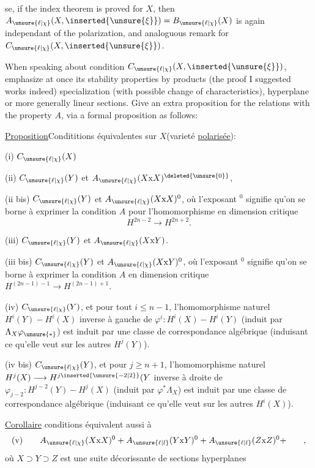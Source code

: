 se, if the index theorem is proved for $X$, then $A_{\unsure{\ell|\chi}}(X,\inserted{\unsure{\xi}})=B_{\unsure{\ell|\chi}}(X)$ is again independant of the polarization, and analoguous remark for $C_{\unsure{\ell|\chi}}(X,\inserted{\unsure{\xi}})$.

When speaking about condition $C_{\unsure{\ell|\chi}}(X,\inserted{\unsure{\xi}})$, emphasize at once its stability properties by products (the proof I suggested works indeed) specialization (with possible change of characteristics), hyperplane or more generally linear sections. Give an extra proposition for the relations with the property $A$, via a formal proposition as follows:

\uline{Proposition}\quad Condititions équivalentes sur $X$(varieté \uline{polarisée}):

(i) $C_{\unsure{\ell|\chi}}(X)$

(ii) $C_{\unsure{\ell|\chi}}(Y)$ et $A_{\unsure{\ell|\chi}}(X\mathrm{x}X)^{\deleted{\unsure{0}}}$, 

(ii bis) $C_{\unsure{\ell|\chi}}(Y)$ et $A_{\unsure{\ell|\chi}}(X\mathrm{x}X)^0$, où l'exposant $^0$ signifie qu'on se borne à exprimer la condition $A$ pour l'homomorphisme en dimension critique
\[
H^{2n-2}\longrightarrow H^{2n+2}.
\]

(iii) $C_{\unsure{\ell|\chi}}(Y)$ et $A_{\unsure{\ell|\chi}}(X\mathrm{x}Y)$.

(iii bis) $C_{\unsure{\ell|\chi}}(Y)$ et $A_{\unsure{\ell|\chi}}(X\mathrm{x}Y)^0$, où l'exposant $^0$ signifie qu'on se borne à exprimer la condition $A$ en dimension critique $H^{(2n-1)-1}\longrightarrow H^{(2n-1)+1}$.

(iv)  $C_{\unsure{\ell|\chi}}(Y)$, et pour tout $i\leq n-1$, l'homomorphisme naturel $H^i(Y)\mathbin{-}H^i(X)$ inverse à gauche de $\varphi^i:H^i(X)\mathbin{-}H^i(Y)$ (induit par $\Lambda_X\varphi_{\unsure{*}}$) est induit par une classe de correspondance algébrique (induisant ce qu'elle veut sur les autres $H^j(Y)$).

(iv bis) $C_{\unsure{\ell|\chi}}(Y)$, et pour $j\geq n+1$, l'homomorphisme naturel $H^j(X)\longrightarrow H^{j\inserted{\unsure{-2|2}}}(Y$ inverse à droite de $\varphi_{j-2}:H^{j-2}(Y)\mathbin{-}H^j(X)$  (induit par $\varphi^*\Lambda_X$) est induit par une classe de correspondance algébrique (induisant ce qu'elle veut sur les autres $H^i(X)$).

\uline{Corollaire}\quad {} conditions équivalent aussi à
\[
\text{(v)}\qquad A_{\unsure{\ell|\chi}}(X\mathrm{x}X)^0+A_{\unsure{\ell|l}}(Y\mathrm{x}Y)^0+A_{\unsure{\ell|l}}(Z\mathrm{x}Z)^0+\qquad,
\]
où $X\supset Y\supset Z$ est une suite décorissante de sections hyperplanes
